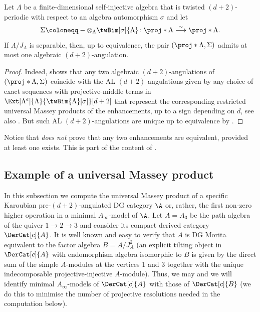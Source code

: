 \documentclass[a4paper]{amsart}
\begin{document}
\begin{corollary}
  \label{coro:atmostone}
  Let $\Lambda$ be a finite-dimensional self-injective algebra that is twisted
  $(d+2)$-periodic with respect to an algebra automorphism $\sigma$ and let
  \[
    \Sigma\coloneqq-\otimes_\Lambda\twBim[\sigma]{\Lambda}\colon\proj*{\Lambda}\stackrel{\sim}{\longrightarrow}\proj*{\Lambda}.
  \]
  If $\Lambda/J_\Lambda$ is separable, then, up to equivalence, the pair
  $(\proj*{\Lambda},\Sigma)$ admits at most one algebraic $(d+2)$-angulation.
\end{corollary}
\begin{proof}
  Indeed,  shows that any two algebraic
  $(d+2)$-angulations of $(\proj*{\Lambda},\Sigma)$ coincide with the AL
  $(d+2)$-angulations given by any choice of exact sequences with
  projective-middle terms in
  $\Ext[\Lambda^e]{\Lambda}{\twBim{\Lambda}[\sigma]}[d+2]$ that represent the
  corresponding restricted universal Massey products of the enhancements, up to
  a sign depending on $d$, see also
  . But such AL $(d+2)$-angulations
  are unique up to equivalence by .
\end{proof}

\begin{remark}
  Notice that  \emph{does not} prove that any two
  enhancements are equivalent, provided at least one exists. This is part of the
  content of .
\end{remark}

\subsection{Example of a universal Massey product}

In this subsection we compute the universal Massey product of a specific
Karoubian pre-$(d+2)$-angulated DG category $\A$ or, rather, the first non-zero
higher operation in a minimal $A_\infty$-model of $\A$. Let $A=A_3$ be the path
algebra of the quiver $1\to 2\to 3$ and consider its compact derived category
$\DerCat[c]{A}$. It is well known and easy to verify that $A$ is DG Morita
equivalent to the factor algebra $B=A/J_A^2$ (an explicit tilting object in
$\DerCat[c]{A}$ with endomorphism algebra isomorphic to $B$ is given by the
direct sum of the simple $A$-modules at the vertices $1$ and $3$ together with
the unique indecomposable projective-injective $A$-module). Thus, we may and we
will identify minimal $A_\infty$-models of $\DerCat[c]{A}$ with those of
$\DerCat[c]{B}$ (we do this to minimise the number of projective resolutions
needed in the computation below).
\end{document}
